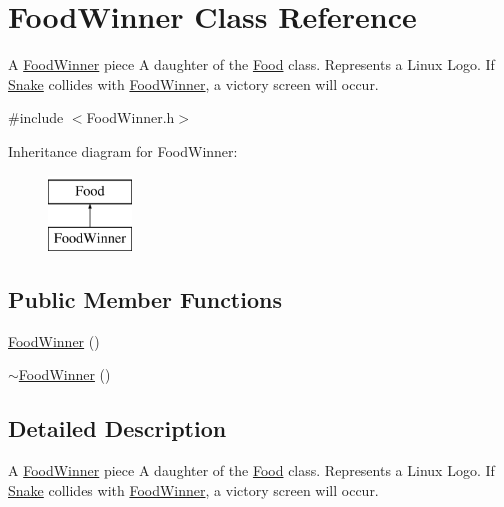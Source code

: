 \hypertarget{classFoodWinner}{\section{\-Food\-Winner \-Class \-Reference}
\label{classFoodWinner}
}


\-A \hyperlink{classFoodWinner}{\-Food\-Winner} piece \-A daughter of the \hyperlink{classFood}{\-Food} class. \-Represents a \-Linux \-Logo. \-If \hyperlink{classSnake}{\-Snake} collides with \hyperlink{classFoodWinner}{\-Food\-Winner}, a victory screen will occur.  




{\ttfamily \#include $<$\-Food\-Winner.\-h$>$}

\-Inheritance diagram for \-Food\-Winner\-:\begin{figure}[H]
\begin{center}
\leavevmode
\includegraphics[height=2.000000cm]{classFoodWinner}
\end{center}
\end{figure}
\subsection*{\-Public \-Member \-Functions}
\begin{DoxyCompactItemize}
\item 
\hyperlink{classFoodWinner_a7a2f3f0cefcb12b4ec423f8511aefd01}{\-Food\-Winner} ()
\item 
\hyperlink{classFoodWinner_aea338ffe14d81d42a6298ebeab930621}{$\sim$\-Food\-Winner} ()
\end{DoxyCompactItemize}


\subsection{\-Detailed \-Description}
\-A \hyperlink{classFoodWinner}{\-Food\-Winner} piece \-A daughter of the \hyperlink{classFood}{\-Food} class. \-Represents a \-Linux \-Logo. \-If \hyperlink{classSnake}{\-Snake} collides with \hyperlink{classFoodWinner}{\-Food\-Winner}, a victory screen will occur. 

